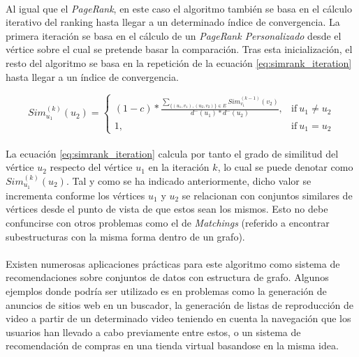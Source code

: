 \documentclass{subfiles}
\begin{document}
        \paragraph{}
        Al igual que el \emph{PageRank}, en este caso el algoritmo también se basa en el cálculo iterativo del ranking hasta llegar a un determinado índice de convergencia. La primera iteración se basa en el cálculo de un \emph{PageRank Personalizado} desde el vértice sobre el cual se pretende basar la comparación. Tras esta inicialización, el resto del algoritmo se basa en la repetición de la ecuación \eqref{eq:simrank_iteration} hasta llegar a un índice de convergencia.

        \begin{equation}
        \label{eq:simrank_iteration}
          Sim^{(k)}_{u_1}({u_2}) =
          \begin{cases}
            (1-c) * \frac{\sum_{\{(u_1,v_1),(u_2,v_2)\} \in E} Sim^{(k-1)}_{v_1}({v_2})}{d^-({u_1})*d^-({u_2})}, & \text{if} \ u_1 \neq u_2 \\
            1, & \text{if} \ u_1 = u_2
          \end{cases}
        \end{equation}

        \paragraph{}
        La ecuación \eqref{eq:simrank_iteration} calcula por tanto el grado de similitud del vértice $u_2$ respecto del vértice $u_1$ en la iteración $k$, lo cual se puede denotar como $Sim^{(k)}_{u_1}({u_2})$. Tal y como se ha indicado anteriormente, dicho valor se incrementa conforme los vértices $u_1$ y $u_2$ se relacionan con conjuntos similares de vértices desde el punto de vista de que estos sean los mismos. Esto no debe confuncirse con otros problemas como el de \emph{Matchings} (referido a encontrar subestructuras con la misma forma dentro de un grafo).

        \paragraph{}
        Existen numerosas aplicaciones prácticas para este algoritmo como sistema de recomendaciones sobre conjuntos de datos con estructura de grafo. Algunos ejemplos donde podría ser utilizado es en problemas como la generación de anuncios de sitios web en un buscador, la generación de listas de reproducción de video a partir de un determinado video teniendo en cuenta la navegación que los usuarios han llevado a cabo previamente entre estos, o un sistema de recomendación de compras en una tienda virtual basandose en la misma idea.
\end{document}
